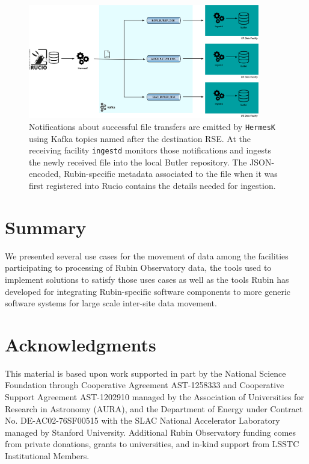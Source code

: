 \documentclass{webofc}
\begin{document}
\begin{figure}[h]
\includegraphics[width=0.9\textwidth, center]{images/HermesAndIngestd.png}
\caption{Notifications about successful file transfers are emitted by \texttt{HermesK} using Kafka topics named after the destination RSE. At the receiving facility \texttt{ingestd} monitors those notifications and ingests the newly received file into the local Butler repository. The JSON-encoded, Rubin-specific metadata associated to the file when it was first registered into Rucio contains the details needed for ingestion.}
\label{fig:kafka-control-plane}
\end{figure}


\section{Summary}
\label{summary}
We presented several use cases for the movement of data among the facilities participating to processing of Rubin Observatory data, the tools used to implement solutions to satisfy those uses cases as well as the tools Rubin has developed for integrating Rubin-specific software components to more generic software systems for large scale inter-site data movement.

\section{Acknowledgments}

This material is based upon work supported in part by the National Science Foundation through Cooperative Agreement AST-1258333 and Cooperative Support Agreement AST-1202910 managed by the Association of Universities for Research in Astronomy (AURA), and the Department of Energy under Contract No. DE-AC02-76SF00515 with the SLAC National Accelerator Laboratory managed by Stanford University. Additional Rubin Observatory funding comes from private donations, grants to universities, and in-kind support from LSSTC Institutional Members.


\end{document}
